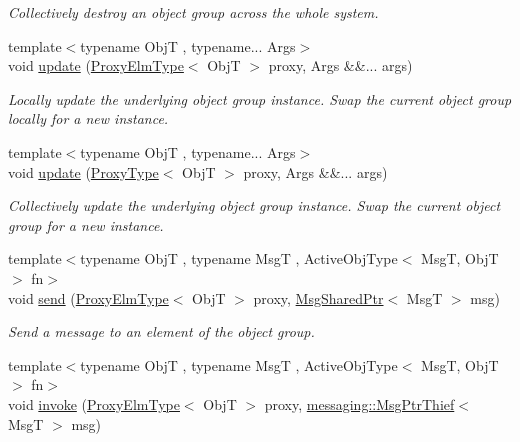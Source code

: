 \begin{DoxyCompactItemize}
\begin{DoxyCompactList}\small\item\em Collectively destroy an object group across the whole system. \end{DoxyCompactList}\item 
{\footnotesize template$<$typename ObjT , typename... Args$>$ }\\void \hyperlink{structvt_1_1objgroup_1_1_obj_group_manager_abd0f61b0578a268a27420f2c38e3b12d}{update} (\hyperlink{structvt_1_1objgroup_1_1_obj_group_manager_adba6c8ecb0f4c30e719f1abb995cfc9b}{Proxy\+Elm\+Type}$<$ ObjT $>$ proxy, Args \&\&... args)
\begin{DoxyCompactList}\small\item\em Locally update the underlying object group instance. Swap the current object group locally for a new instance. \end{DoxyCompactList}\item 
{\footnotesize template$<$typename ObjT , typename... Args$>$ }\\void \hyperlink{structvt_1_1objgroup_1_1_obj_group_manager_a36d8749cf4f42e6b912159e9b4f959d6}{update} (\hyperlink{structvt_1_1objgroup_1_1_obj_group_manager_aea65eef52f240a52210132eef5ce591f}{Proxy\+Type}$<$ ObjT $>$ proxy, Args \&\&... args)
\begin{DoxyCompactList}\small\item\em Collectively update the underlying object group instance. Swap the current object group for a new instance. \end{DoxyCompactList}\item 
{\footnotesize template$<$typename ObjT , typename MsgT , Active\+Obj\+Type$<$ Msg\+T, Obj\+T $>$ fn$>$ }\\void \hyperlink{structvt_1_1objgroup_1_1_obj_group_manager_a4b45c347778fda185d97b4c6af4ec58e}{send} (\hyperlink{structvt_1_1objgroup_1_1_obj_group_manager_adba6c8ecb0f4c30e719f1abb995cfc9b}{Proxy\+Elm\+Type}$<$ ObjT $>$ proxy, \hyperlink{namespacevt_ab2b3d506ec8e8d1540aede826d84a239}{Msg\+Shared\+Ptr}$<$ MsgT $>$ msg)
\begin{DoxyCompactList}\small\item\em Send a message to an element of the object group. \end{DoxyCompactList}\item 
{\footnotesize template$<$typename ObjT , typename MsgT , Active\+Obj\+Type$<$ Msg\+T, Obj\+T $>$ fn$>$ }\\void \hyperlink{structvt_1_1objgroup_1_1_obj_group_manager_a5ff347b7aca2c08892d3206c4b028fd3}{invoke} (\hyperlink{structvt_1_1objgroup_1_1_obj_group_manager_adba6c8ecb0f4c30e719f1abb995cfc9b}{Proxy\+Elm\+Type}$<$ ObjT $>$ proxy, \hyperlink{structvt_1_1messaging_1_1_msg_ptr_thief}{messaging\+::\+Msg\+Ptr\+Thief}$<$ MsgT $>$ msg)

\end{DoxyCompactItemize}
